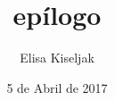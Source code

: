 \documentclass[a5paper,doc,12pt,apacite]{apa}
\affiliation{Tres historias europeas}
\author{Elisa Kiseljak}
\title{epílogo}
\date{5 de Abril de 2017}
\begin{document}
	\maketitle
		
	
	\nocite{Bosch}
	 
	
\end{document}
